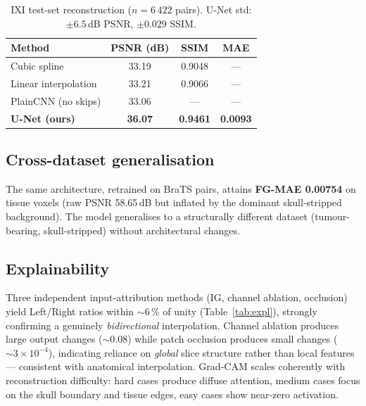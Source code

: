 \documentclass[10pt,a4paper]{article}
\begin{document}
\begin{table}[h]
    \centering
    \footnotesize
    \begin{tabular}{lccc}
        \toprule
        Method                & PSNR (dB)        & SSIM              & MAE      \\
        \midrule
        Cubic spline          & 33.19            & 0.9048            & ---      \\
        Linear interpolation  & 33.21            & 0.9066            & ---      \\
        PlainCNN (no skips)   & 33.06            & ---               & ---      \\
        \textbf{U-Net (ours)} & \textbf{36.07}   & \textbf{0.9461}   & \textbf{0.0093} \\
        \bottomrule
    \end{tabular}
    \caption{IXI test-set reconstruction ($n{=}6\,422$ pairs). U-Net std:
    $\pm6.5$\,dB PSNR, $\pm0.029$ SSIM.}
    \label{tab:ixi}
\end{table}

\subsection{Cross-dataset generalisation}
The same architecture, retrained on BraTS pairs, attains
\textbf{FG-MAE 0.00754} on tissue voxels (raw PSNR 58.65\,dB but inflated by
the dominant skull-stripped background). The model generalises to a
structurally different dataset (tumour-bearing, skull-stripped) without
architectural changes.

\subsection{Explainability}
Three independent input-attribution methods (IG, channel ablation,
occlusion) yield Left/Right ratios within $\sim$6\,\% of unity
(Table~\ref{tab:expl}), strongly confirming a genuinely \emph{bidirectional}
interpolation. Channel ablation produces large output changes ($\sim 0.08$)
while patch occlusion produces small changes ($\sim 3\!\times\!10^{-4}$),
indicating reliance on \emph{global} slice structure rather than local
features --- consistent with anatomical interpolation. Grad-CAM scales
coherently with reconstruction difficulty: hard cases produce diffuse
attention, medium cases focus on the skull boundary and tissue edges, easy
cases show near-zero activation.
\end{document}
